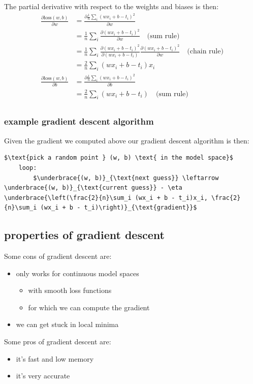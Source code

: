 \documentclass[12pt]{article}
\theoremstyle{definition}
\begin{document}
The partial derivative with respect to the weights and biases is then:
\begin{align*}
    \frac{\partial \text{loss}(w, b)}{\partial w} & = \frac{\partial \frac{1}{n} \sum_i (wx_i + b - t_i)^2}{\partial w} \\ 
    & = \frac{1}{n}\sum_i \frac{\partial (wx_i + b - t_i)^2}{\partial w} \quad \text{(sum rule)} \\
    & = \frac{1}{n}\sum_i \frac{\partial (wx_i + b - t_i)^2}{\partial (wx_i + b - t_i)}\frac{\partial (wx_i + b - t_i)^2}{\partial w} \quad \text{(chain rule)} \\ 
    & = \frac{2}{n}\sum_i (wx_i + b - t_i)x_i \\
    \frac{\partial \text{loss}(w, b)}{\partial b} & = \frac{\partial \frac{1}{n} \sum_i (wx_i + b - t_i)^2}{\partial b} \\
    & = \frac{2}{n}\sum_i (wx_i + b - t_i) \quad \text{(sum rule)} \\
\end{align*}
\subsubsection*{example gradient descent algorithm}
Given the gradient we computed above our gradient descent algorithm is then:
\begin{lstlisting}[caption=gradient descent algorithm example]
    $\text{pick a random point } (w, b) \text{ in the model space}$
    loop:
        $\underbrace{(w, b)}_{\text{next guess}} \leftarrow \underbrace{(w, b)}_{\text{current guess}} - \eta \underbrace{\left(\frac{2}{n}\sum_i (wx_i + b - t_i)x_i, \frac{2}{n}\sum_i (wx_i + b - t_i)\right)}_{\text{gradient}}$
\end{lstlisting}

\subsection{properties of gradient descent}
\begin{multicols}{2}
    Some cons of gradient descent are:
    \begin{itemize}[leftmargin=*, noitemsep]
        \item only works for continuous model spaces
        \begin{itemize}[leftmargin=*, noitemsep]
            \item with smooth loss functions
            \item for which we can compute the gradient
        \end{itemize}
        \item we can get stuck in local minima
    \end{itemize}
    \columnbreak
    Some pros of gradient descent are:
    \begin{itemize}[leftmargin=*, noitemsep]
        \item it's fast and low memory
        \item it's very accurate 
    \end{itemize}
    
\end{multicols}
\end{document}

